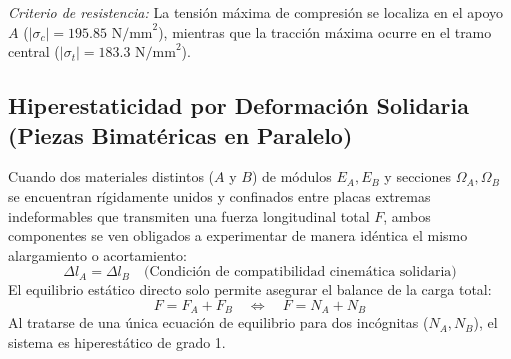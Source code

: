 {\begin{center}
{%
        }
    \end{center}

    \textit{Criterio de resistencia:} La tensión máxima de compresión se localiza en el apoyo $A$ ($|\sigma_c| = 195.85\text{ N/mm}^2$), mientras que la tracción máxima ocurre en el tramo central ($|\sigma_t| = 183.3\text{ N/mm}^2$).
}

\subsection{Hiperestaticidad por Deformación Solidaria (Piezas Bimatéricas en Paralelo)}

Cuando dos materiales distintos ($A$ y $B$) de módulos $E_A, E_B$ y secciones $\Omega_A, \Omega_B$ se encuentran rígidamente unidos y confinados entre placas extremas indeformables que transmiten una fuerza longitudinal total $F$, ambos componentes se ven obligados a experimentar de manera idéntica el mismo alargamiento o acortamiento:
\begin{equation}
    \Delta l_A = \Delta l_B \quad \text{(Condición de compatibilidad cinemática solidaria)}
\end{equation}
El equilibrio estático directo solo permite asegurar el balance de la carga total:
\begin{equation}
    F = F_A + F_B \quad \Longleftrightarrow \quad F = N_A + N_B
\end{equation}
Al tratarse de una única ecuación de equilibrio para dos incógnitas ($N_A, N_B$), el sistema es hiperestático de grado 1.

